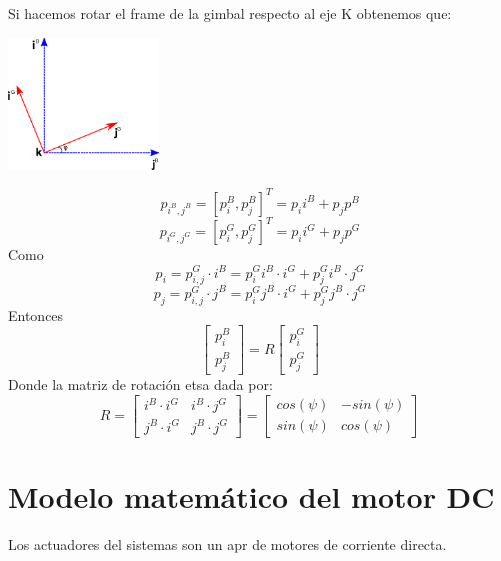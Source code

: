 Si hacemos rotar el frame de la gimbal respecto al eje K obtenemos que:
\begin{center}
	\includegraphics[width=0.3\textwidth]{Contenido/Cuerpo/Capitulo3/Fig9.eps}
	\label{fig:ModeloMat:Fig1}
\end{center}
\begin{equation}
	p_{i^B,j^B} = [p_i^B , p_j^B]^T = p_i i^B + p_j p^B
\end{equation}
\begin{equation}
	p_{i^G,j^G} = [p_i^G , p_j^G]^T = p_i i^G + p_j p^G
\end{equation}
Como
\begin{equation}
	p_i = p_{i,j}^G \cdot i^B = p_i^G i^B \cdot i^G + p_j^G i^B \cdot j^G
\end{equation}
\begin{equation}
	p_j = p_{i,j}^G \cdot j^B = p_i^G j^B \cdot i^G + p_j^G j^B \cdot j^G
\end{equation}
Entonces
\begin{equation*}
	\begin{bmatrix}
		p_i^B \\
		p_j^B
	\end{bmatrix}
	=
	R
	\begin{bmatrix}
		p_i^G \\
		p_j^G
	\end{bmatrix}
\end{equation*}
Donde la matriz de rotación etsa dada por:
\begin{equation*}
	R=
	\begin{bmatrix}
		i^B\cdot i^G & i^B \cdot j^G \\
		j^B\cdot i^G & j^B \cdot j^G
	\end{bmatrix}
	=
	\begin{bmatrix}
		cos(\psi) & -sin(\psi) \\
		sin(\psi) & cos(\psi)
	\end{bmatrix}
\end{equation*}

\section{Modelo matemático del motor DC}
Los actuadores del sistemas son un apr de motores de corriente directa.